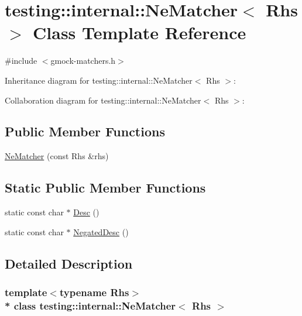 \hypertarget{classtesting_1_1internal_1_1_ne_matcher}{}\section{testing\+:\+:internal\+:\+:Ne\+Matcher$<$ Rhs $>$ Class Template Reference}
\label{classtesting_1_1internal_1_1_ne_matcher}


{\ttfamily \#include $<$gmock-\/matchers.\+h$>$}



Inheritance diagram for testing\+:\+:internal\+:\+:Ne\+Matcher$<$ Rhs $>$\+:


Collaboration diagram for testing\+:\+:internal\+:\+:Ne\+Matcher$<$ Rhs $>$\+:
\subsection*{Public Member Functions}
\begin{DoxyCompactItemize}
\item 
\hyperlink{classtesting_1_1internal_1_1_ne_matcher_a64842882811cc96624c87119c51edd3e}{Ne\+Matcher} (const Rhs \&rhs)
\end{DoxyCompactItemize}
\subsection*{Static Public Member Functions}
\begin{DoxyCompactItemize}
\item 
static const char $\ast$ \hyperlink{classtesting_1_1internal_1_1_ne_matcher_a2ec33febe5471f9d435b4dc9f5cda564}{Desc} ()
\item 
static const char $\ast$ \hyperlink{classtesting_1_1internal_1_1_ne_matcher_a9ea152391b69d422ba2a88c3d2d2dae5}{Negated\+Desc} ()
\end{DoxyCompactItemize}


\subsection{Detailed Description}
\subsubsection*{template$<$typename Rhs$>$\\*
class testing\+::internal\+::\+Ne\+Matcher$<$ Rhs $>$}



